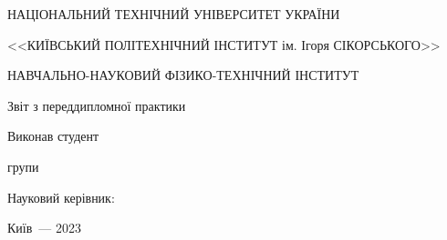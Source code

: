 \thispagestyle{empty}

\begin{center}
НАЦІОНАЛЬНИЙ ТЕХНІЧНИЙ УНІВЕРСИТЕТ УКРАЇНИ \par
<<КИЇВСЬКИЙ ПОЛІТЕХНІЧНИЙ ІНСТИТУТ ім. Ігоря СІКОРСЬКОГО>>\par
НАВЧАЛЬНО-НАУКОВИЙ ФІЗИКО-ТЕХНІЧНИЙ ІНСТИТУТ\par

\vfill
{\huge Звіт з переддипломної практики \par}
\vspace{5mm}
\LARGE{\textbf{\reportTitle}} \par
\end{center}

\vfill
\begin{flushright}
Виконав студент

групи \reportAuthorGroup

\reportAuthor

\vspace{20mm}
Науковий керівник:

\supervisorRegalia

\supervisorFio

\end{flushright}

\vspace{20mm}
\begin{center}
{Київ~--- 2023}
\end{center}

\newpage
\thispagestyle{plain}
